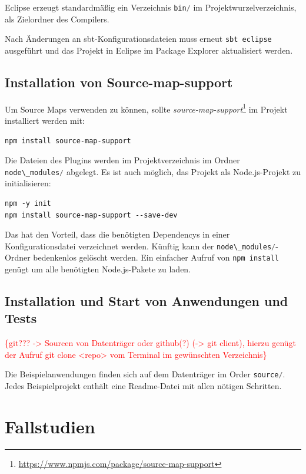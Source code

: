 \documentclass[a4paper, 12pt, hidelinks, listof=totoc, listoftables=totoc, bibliography=totoc]{scrreprt}
\newcommand{\code}[1]{\lstinline[language=Scala, style=inline]|#1|}
\newcommand{\TODOi}[1]{\textcolor{red}{\{#1\}}}
\begin{document}
Eclipse erzeugt standardmäßig ein Verzeichnis \code{bin/} im Projektwurzelverzeichnis, als Zielordner des Compilers.

Nach Änderungen an sbt-Konfigurationsdateien muss erneut \code{sbt eclipse} ausgeführt und das Projekt in Eclipse im Package Explorer aktualisiert werden.



\section{Installation von Source-map-support}

Um Source Maps verwenden zu können, sollte \emph{source-map-support}\footnote{\url{https://www.npmjs.com/package/source-map-support}} im Projekt installiert werden mit:

\begin{lstlisting}[style=snippet]
npm install source-map-support
\end{lstlisting}

Die Dateien des Plugins werden im Projektverzeichnis im Ordner \mbox{\code{node\_modules/}} abgelegt. Es ist auch möglich, das Projekt als Node.js-Projekt zu initialisieren:

\begin{lstlisting}[style=snippet]
npm -y init
npm install source-map-support --save-dev
\end{lstlisting}

Das hat den Vorteil, dass die benötigten Dependencys in einer Konfigurationsdatei verzeichnet werden. Künftig kann der \code{node\_modules/}-Ordner bedenkenlos gelöscht werden. Ein einfacher Aufruf von \code{npm install} genügt um alle benötigten Node.js-Pakete zu laden.


\section{Installation und Start von Anwendungen und Tests}

\TODOi{git??? -> Sourcen von Datenträger oder github(?) (-> git client), hierzu genügt der Aufruf git clone <repo> vom Terminal im gewünschten Verzeichnis}

Die Beispielanwendungen finden sich auf dem Datenträger im Order \code{source/}. Jedes Beispielprojekt enthält eine Readme-Datei mit allen nötigen Schritten.


\chapter{Fallstudien}\label{chap:case-studies}
\end{document}
